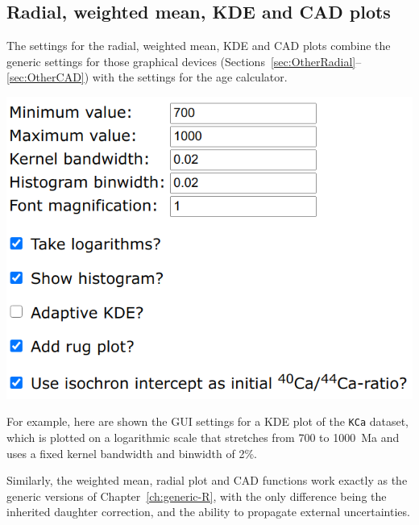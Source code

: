 \begin{refsection}
\section{Radial, weighted mean, KDE and CAD plots}
\label{sec:ArArKCaOtherPlots}

The settings for the radial, weighted mean, KDE and CAD plots combine
the generic settings for those graphical devices
(Sections~\ref{sec:OtherRadial}--\ref{sec:OtherCAD}) with the settings
for the age calculator.\\

\noindent\begin{minipage}[t]{.5\linewidth}
\strut\vspace*{-\baselineskip}\newline
\includegraphics[width=\linewidth]{../figures/KCaKDE.png}
\end{minipage}
\begin{minipage}[t]{.5\linewidth}
  For example, here are shown the GUI settings for a KDE plot of the
  \texttt{KCa} dataset, which is plotted on a logarithmic scale that
  stretches from 700 to 1000~Ma and uses a fixed kernel bandwidth and
  binwidth of 2\%.
\end{minipage}


Similarly, the weighted mean, radial plot and CAD functions work
exactly as the generic versions of Chapter~\ref{ch:generic-R}, with
the only difference being the inherited daughter correction, and the
ability to propagate external uncertainties.\\


\end{refsection}
